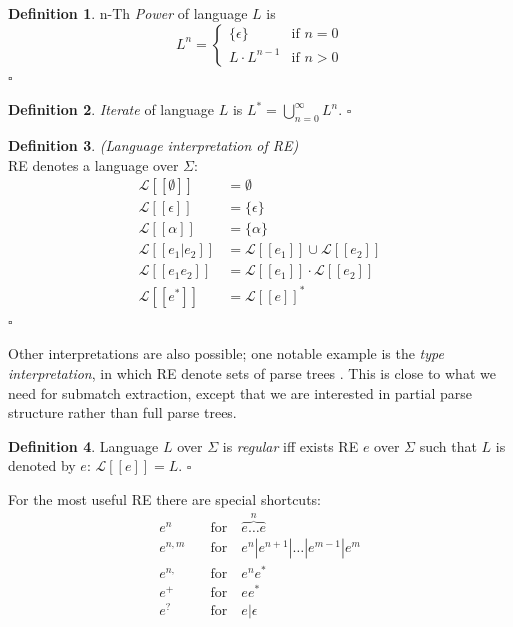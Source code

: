 \documentclass{article}
\newcommand{\Xeq}{\!=\!}
\newcommand{\Xlb}{[\![}
\newcommand{\Xrb}{]\!]}
\newcommand{\XL}{\mathcal{L}}
\theoremstyle{definition}
\newtheorem{Xdef}{Definition}
\begin{document}
\begin{multicols}{2}
    \begin{Xdef}\label{langiterate}
    n-Th \emph{Power} of language $L$ is
    $$L^n = \begin{cases}
            \{ \epsilon \} & \text{if } n \Xeq 0 \\[-0.5em]
            L \cdot L^{n - 1} & \text{if } n\!>\!0
        \end{cases}$$
    $\square$
    \end{Xdef}

    \begin{Xdef}\label{langiterate}
    \emph{Iterate} of language $L$ is
    $L^* = \bigcup\limits_{n = 0}^\infty L^n$.
    $\square$
    \end{Xdef}

    \begin{Xdef}
    \emph{(Language interpretation of RE)} \\
    RE denotes a language over $\Sigma$:
    \begin{align*}
        \XL \Xlb \emptyset \Xrb &= \emptyset \\
        \XL \Xlb \epsilon \Xrb &= \{ \epsilon \} \\
        \XL \Xlb \alpha \Xrb &= \{\alpha\} \\
        \XL \Xlb e_1 | e_2 \Xrb &= \XL \Xlb e_1 \Xrb \cup \XL \Xlb e_2 \Xrb \\
        \XL \Xlb e_1 e_2 \Xrb &= \XL \Xlb e_1 \Xrb \cdot \XL \Xlb e_2 \Xrb \\
        \XL \Xlb e^* \Xrb &= \XL \Xlb e \Xrb ^*
    \end{align*}
    $\square$
    \end{Xdef}

Other interpretations are also possible;
one notable example is the \emph{type interpretation},
in which RE denote sets of parse trees \cite{BT10} \cite{Gra15}.
This is close to what we need for submatch extraction,
except that we are interested in partial parse structure rather than full parse trees.

    \begin{Xdef}
    Language $L$ over $\Sigma$ is \emph{regular} iff exists RE $e$ over $\Sigma$
    such that $L$ is denoted by $e$: $\XL \Xlb e \Xrb \Xeq L$.
    $\square$
    \end{Xdef}

For the most useful RE there are special shortcuts:
    \begin{align*}
        e^n     &\quad\text{for}\quad \overbrace{e \dots e}^{n} \\[-0.5em]
        e^{n,m} &\quad\text{for}\quad e^n | e^{n+1} | \dots | e^{m-1} | e^m \\[-0.5em]
        e^{n,}  &\quad\text{for}\quad e^n e^* \\[-0.5em]
        e^+     &\quad\text{for}\quad ee^* \\[-0.5em]
        e^?     &\quad\text{for}\quad e | \epsilon
    \end{align*}


\end{multicols}
\end{document}
